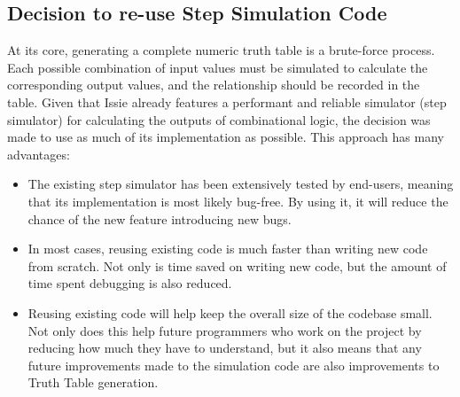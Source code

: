 \subsection{Decision to re-use Step Simulation Code}
At its core, generating a complete numeric truth table is a brute-force process. Each possible combination of input values must be simulated to calculate the corresponding output values, and the relationship should be recorded in the table. 
Given that Issie already features a performant and reliable simulator (step simulator) for calculating the outputs of combinational logic, the decision was made to use as much of its implementation as possible. This approach has many advantages:
\begin{itemize}
    \item The existing step simulator has been extensively tested by end-users, meaning that its implementation is most likely bug-free. By using it, it will reduce the chance of the new feature introducing new bugs.
    \item In most cases, reusing existing code is much faster than writing new code from scratch. Not only is time saved on writing new code, but the amount of time spent debugging is also reduced.
    \item Reusing existing code will help keep the overall size of the codebase small. Not only does this help future programmers who work on the project by reducing how much they have to understand, but it also means that any future improvements made to the simulation code are also improvements to Truth Table generation.
\end{itemize}

